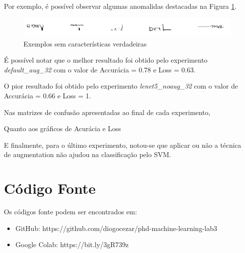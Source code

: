 \documentclass[12pt]{article}
\begin{document}
Por exemplo, é possível observar algumas anomalidas destacadas na Figura \ref{fig:image_months_wrong}.

\begin{figure}[!htb]
  \centering
  \includegraphics[width=35em]{images/image_months_wrong.png}
  \caption{Exemplos sem características verdadeiras}
  \label{fig:image_months_wrong}
\end{figure}

É possível notar que o melhor resultado foi obtido pelo experimento \textit{default\_aug\_32} com o valor de Accurácia = 0.78 e Loss = 0.63.

O pior resultado foi obtido pelo experimento \textit{lenet5\_noaug\_32} com o valor de Accurácia = 0.66 e Loss = 1.

Nas matrizes de confusão apresentadas ao final de cada experimento,

Quanto aos gráficos de Acurácia e Loss

E finalmente, para o último experimento, notou-se que aplicar ou não a técnica de augmentation não ajudou na classificação pelo SVM.

\newpage

\section{Código Fonte}

Os códigos fonte podem ser encontrados em:

\begin{itemize}
  \item GitHub: https://github.com/diogocezar/phd-machine-learning-lab3
  \item Google Colab: https://bit.ly/3gR739z
\end{itemize}
\end{document}
